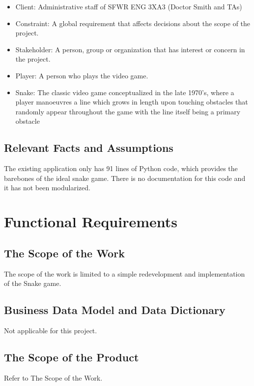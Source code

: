\documentclass[12pt]{article}
\begin{document}
\begin{itemize}

\item Client: Administrative staff of SFWR ENG 3XA3 (Doctor Smith and TAs)
		 	 	 						
\item Constraint: A global requirement that affects decisions about the scope of the project. 
\item Stakeholder: A person, group or organization that has interest or concern in the project.

\item Player: A person who plays the video game.

\item Snake: The classic video game conceptualized in the late 1970’s, where a player manoeuvres a line which grows in length upon touching obstacles that randomly appear throughout the game with the line itself being a primary obstacle
				
\end{itemize}

\subsection{Relevant Facts and Assumptions}

The existing application only has 91 lines of Python code, which provides the barebones of the ideal snake game. There is no documentation for this code and it has not been modularized.

\section*{Functional Requirements}

\subsection{The Scope of the Work}
The scope of the work is limited to a simple redevelopment and implementation of the Snake game.

\subsection{Business Data Model and Data Dictionary}
Not applicable for this project.

\subsection{The Scope of the Product}
Refer to The Scope of the Work.
\end{document}
